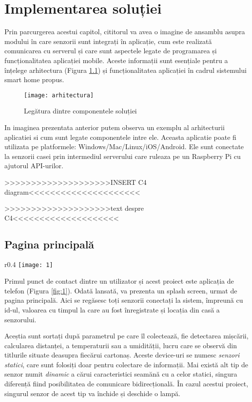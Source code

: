 \chapter{Implementarea soluției}

Prin parcurgerea acestui capitol, cititorul va avea o imagine de ansamblu asupra modului în care senzorii sunt integrați în aplicație, cum este realizată comunicarea cu serverul și care sunt aspectele legate de programarea și funcționalitatea aplicației mobile. Aceste informații sunt esențiale pentru a înțelege arhitectura (Figura \ref{fig:arhitectura}) și funcționalitatea aplicației în cadrul sistemului smart home propus.

\begin{figure}[h]
	\centering
	\texttt{[image: arhitectura]}
	\caption{Legătura dintre componentele soluției}
	\label{fig:arhitectura}
\end{figure}

In imaginea prezentata anterior putem observa un exemplu al arhitecturii aplicatiei si cum sunt legate componentele intre ele. Aceasta aplicatie poate fi utilizata pe platformele: Windows/Mac/Linux/iOS/Android. Ele sunt conectate la senzorii casei prin intermediul serverului care ruleaza pe un Raspberry Pi cu ajutorul API-urilor.

>>>>>>>>>>>>>>>>>>>>INSERT C4 diagram<<<<<<<<<<<<<<<<<<<<<

>>>>>>>>>>>>>>>>>>>>text despre C4<<<<<<<<<<<<<<<<<<<< 

\newpage
\section{Pagina principală}

\begin{wrapfigure}{r}{0.4\textwidth}
	\texttt{[image: 1]}
	\caption{Pagina principală}
	\label{fig:1}
\end{wrapfigure}

Primul punct de contact dintre un utilizator și acest proiect este aplicația de telefon (Figura \ref{fig:1}). Odată lansată, va prezenta un splash screen, urmat de pagina principală. Aici se regăsesc toți senzorii conectați la sistem, împreună cu id-ul, valoarea cu timpul la care au fost înregistrate și locația din casă a senzorului. 

Aceștia sunt sortați după parametrul pe care îl colectează, fie detectarea mișcării, calcularea distanței, a temperaturii sau a umidității, lucru care se observă din titlurile situate deasupra fiecărui cartonaș. Aceste device-uri se numesc \emph{senzori statici}, care sunt folosiți doar pentru colectare de informații. Mai există alt tip de senzor numit \emph{dinamic} a cărui caracteristici seamănă cu a celor statici, singura diferență fiind posibilitatea de comunicare bidirecțională. În cazul acestui proiect, singurul senzor de acest tip va închide și deschide o lampă.

